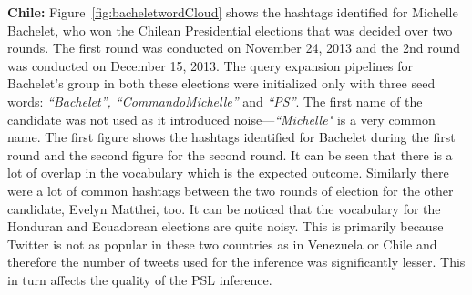 \noindent
{\bf Chile:}
Figure~\ref{fig:bacheletwordCloud} shows the hashtags identified for Michelle Bachelet, who won the Chilean Presidential elections that was decided over two rounds.
The first round was conducted on November 24, 2013 and the 2nd round was conducted on December 15, 2013. 
The query expansion pipelines for Bachelet's group in both these elections were initialized only with three seed words: {\emph{``Bachelet'', ``CommandoMichelle''} and \emph{``PS''}}. 
The first name of the candidate was not used as it introduced noise---\emph{``Michelle"} is a very common name.
The first figure shows the hashtags identified for Bachelet during the first round and the second figure for the second round. 
It can be seen that there is a lot of overlap in the vocabulary which is the expected outcome. 
Similarly there were a lot of common hashtags between the two rounds of election for the other candidate, Evelyn Matthei, too.
It can be noticed that the vocabulary for the Honduran and Ecuadorean  elections are quite noisy. 
This is primarily because Twitter is not as popular in these two countries as in Venezuela or Chile and therefore the number of tweets
used for the inference was significantly lesser.
This in turn affects the quality of the PSL inference.


